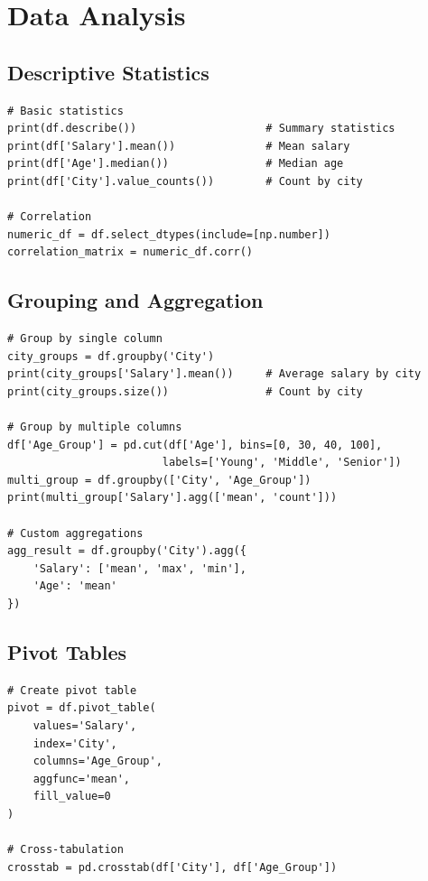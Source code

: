 \documentclass[12pt,a4paper]{article}
\begin{document}
\section{Data Analysis}

\subsection{Descriptive Statistics}

\begin{lstlisting}
# Basic statistics
print(df.describe())                    # Summary statistics
print(df['Salary'].mean())              # Mean salary
print(df['Age'].median())               # Median age
print(df['City'].value_counts())        # Count by city

# Correlation
numeric_df = df.select_dtypes(include=[np.number])
correlation_matrix = numeric_df.corr()
\end{lstlisting}

\subsection{Grouping and Aggregation}

\begin{lstlisting}
# Group by single column
city_groups = df.groupby('City')
print(city_groups['Salary'].mean())     # Average salary by city
print(city_groups.size())               # Count by city

# Group by multiple columns
df['Age_Group'] = pd.cut(df['Age'], bins=[0, 30, 40, 100], 
                        labels=['Young', 'Middle', 'Senior'])
multi_group = df.groupby(['City', 'Age_Group'])
print(multi_group['Salary'].agg(['mean', 'count']))

# Custom aggregations
agg_result = df.groupby('City').agg({
    'Salary': ['mean', 'max', 'min'],
    'Age': 'mean'
})
\end{lstlisting}

\subsection{Pivot Tables}

\begin{lstlisting}
# Create pivot table
pivot = df.pivot_table(
    values='Salary',
    index='City',
    columns='Age_Group',
    aggfunc='mean',
    fill_value=0
)

# Cross-tabulation
crosstab = pd.crosstab(df['City'], df['Age_Group'])
\end{lstlisting}
\end{document}
